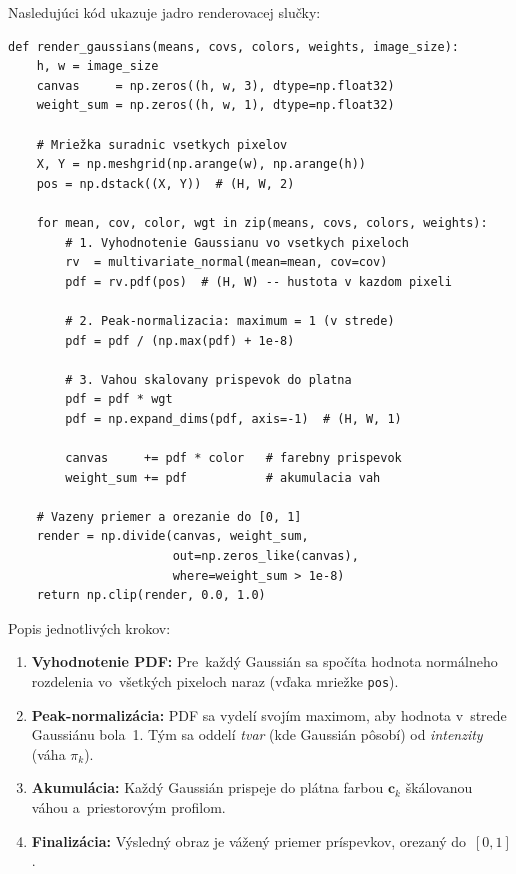 \documentclass[a4paper,11pt]{article}
\begin{document}
Nasledujúci kód ukazuje jadro renderovacej slučky:

\begin{lstlisting}
def render_gaussians(means, covs, colors, weights, image_size):
    h, w = image_size
    canvas     = np.zeros((h, w, 3), dtype=np.float32)
    weight_sum = np.zeros((h, w, 1), dtype=np.float32)

    # Mriežka suradnic vsetkych pixelov
    X, Y = np.meshgrid(np.arange(w), np.arange(h))
    pos = np.dstack((X, Y))  # (H, W, 2)

    for mean, cov, color, wgt in zip(means, covs, colors, weights):
        # 1. Vyhodnotenie Gaussianu vo vsetkych pixeloch
        rv  = multivariate_normal(mean=mean, cov=cov)
        pdf = rv.pdf(pos)  # (H, W) -- hustota v kazdom pixeli

        # 2. Peak-normalizacia: maximum = 1 (v strede)
        pdf = pdf / (np.max(pdf) + 1e-8)

        # 3. Vahou skalovany prispevok do platna
        pdf = pdf * wgt
        pdf = np.expand_dims(pdf, axis=-1)  # (H, W, 1)

        canvas     += pdf * color   # farebny prispevok
        weight_sum += pdf           # akumulacia vah

    # Vazeny priemer a orezanie do [0, 1]
    render = np.divide(canvas, weight_sum,
                       out=np.zeros_like(canvas),
                       where=weight_sum > 1e-8)
    return np.clip(render, 0.0, 1.0)
\end{lstlisting}

\noindent
Popis jednotlivých krokov:
\begin{enumerate}[nosep]
  \item \textbf{Vyhodnotenie PDF:} Pre~každý Gaussián sa spočíta hodnota
        normálneho rozdelenia vo~všetkých pixeloch naraz (vďaka mriežke
        \texttt{pos}).
  \item \textbf{Peak-normalizácia:} PDF sa vydelí svojím maximom, aby
        hodnota v~strede Gaussiánu bola~1.  Tým sa oddelí \emph{tvar}
        (kde Gaussián pôsobí) od \emph{intenzity} (váha $\pi_k$).
  \item \textbf{Akumulácia:} Každý Gaussián prispeje do plátna
        farbou $\mathbf{c}_k$ škálovanou váhou a~priestorovým profilom.
  \item \textbf{Finalizácia:} Výsledný obraz je vážený priemer
        príspevkov, orezaný do~$[0, 1]$.
\end{enumerate}

\end{document}
